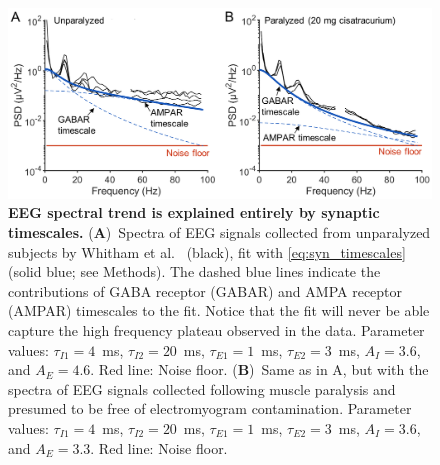 \begin{figure}[t!]
    \centering
    \includegraphics[width=13.2cm]{Figures/chapter3/figure5.png}
    \caption[EEG spectral trend is explained entirely by synaptic timescales]{\textbf{EEG spectral trend is explained entirely by synaptic timescales.} (\textbf{A})~Spectra of EEG signals collected from unparalyzed subjects by Whitham et al.~\cite{Whitham2007} (black), fit with {\ref{eq:syn_timescales}} (solid blue; see Methods). The dashed blue lines indicate the contributions of GABA receptor (GABAR) and AMPA receptor (AMPAR) timescales to the fit. Notice that the fit will never be able capture the high frequency plateau observed in the data. Parameter values: $\tau_{I1}=4$~\unit{\milli\second}, $\tau_{I2}=20$~\unit{\milli\second}, $\tau_{E1}=1$~\unit{\milli\second}, $\tau_{E2}=3$~\unit{\milli\second}, $A_I=3.6$, and $A_E=4.6$.  Red line: Noise floor. (\textbf{B})~Same as in A, but with the spectra of EEG signals collected following muscle paralysis and presumed to be free of electromyogram contamination. Parameter values: $\tau_{I1}=4$~\unit{\milli\second}, $\tau_{I2}=20$~\unit{\milli\second}, $\tau_{E1}=1$~\unit{\milli\second}, $\tau_{E2}=3$~\unit{\milli\second}, $A_I=3.6$, and $A_E=3.3$. Red line: Noise floor.}
    \label{fig:paralytic_data}
\end{figure}

